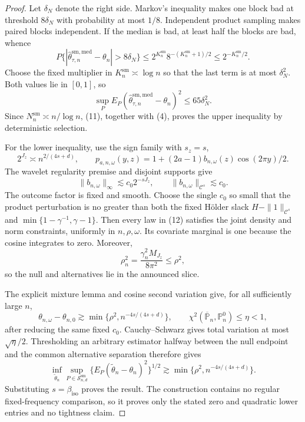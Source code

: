 \documentclass{article}
\begin{document}
\begin{proof}
Let \(\delta_N\) denote the right side.  Markov's inequality makes one block bad at threshold \(8\delta_N\) with probability at most \(1/8\).  Independent product sampling makes paired blocks independent.  If the median is bad, at least half the blocks are bad, whence
\[
P\{|\widehat\theta^{\mathrm{sm,med}}_{\tau,n}-\theta_n|>8\delta_N\}
\le2^{K_n^{\mathrm{sm}}}8^{-(K_n^{\mathrm{sm}}+1)/2}
\le2^{-K_n^{\mathrm{sm}}/2}. \tag{10}
\]
Choose the fixed multiplier in \(K_n^{\mathrm{sm}}\asymp\log n\) so that the last term is at most \(\delta_N^2\).  Both values lie in \([0,1]\), so
\[
\sup_PE_P(\widehat\theta^{\mathrm{sm,med}}_{\tau,n}-\theta_n)^2
\le65\delta_N^2. \tag{11}
\]
Since \(N_n^{\mathrm{sm}}\asymp n/\log n\), (11), together with (4), proves the upper inequality by deterministic selection.

For the lower inequality, use the sign family with \(s_z=s\),
\[
2^{J_z}\asymp n^{2/(4s+d)},
\qquad
p_{a,n,\omega}(y,z)=1+(2a-1)b_{n,\omega}(z)\cos(2\pi y)/2. \tag{12}
\]
The wavelet regularity premise and disjoint supports give
\[
\|b_{n,\omega}\|_\infty\lesssim c_0 2^{-sJ_z},
\qquad
\|b_{n,\omega}\|_{\mathcal C^s}\lesssim c_0. \tag{13}
\]
The outcome factor is fixed and smooth.  Choose the single \(c_0\) so small that the product perturbation is no greater than both the fixed H\"older slack \(H-\|1\|_{\mathcal C^s}\) and \(\min\{1-\gamma^{-1},\gamma-1\}\).  Then every law in (12) satisfies the joint density and norm constraints, uniformly in \(n,\rho,\omega\).  Its covariate marginal is one because the cosine integrates to zero.  Moreover,
\[
\rho_n^2=\frac{\gamma_n^2M_{J_z}}{8\pi^2}\le\rho^2, \tag{14}
\]
so the null and alternatives lie in the announced slice.

The explicit mixture lemma and cosine second variation give, for all sufficiently large \(n\),
\[
\theta_{n,\omega}-\theta_{n,0}
\gtrsim\min\{\rho^2,n^{-4s/(4s+d)}\},
\qquad
\chi^2(\overline{\mathbb P}_n,\mathbb P_n^0)\le\eta<1, \tag{15}
\]
after reducing the same fixed \(c_0\).  Cauchy--Schwarz gives total variation at most \(\sqrt\eta/2\).  Thresholding an arbitrary estimator halfway between the null endpoint and the common alternative separation therefore gives
\[
\inf_{\widetilde\theta_n}\sup_{P\in\mathcal S^{\mathrm{sm}}_{n,d}}
\{E_P(\widetilde\theta_n-\theta_n)^2\}^{1/2}
\gtrsim\min\{\rho^2,n^{-4s/(4s+d)}\}. \tag{16}
\]
Substituting \(s=\beta_{\mathrm{iso}}\) proves the result.  The construction contains no regular fixed-frequency comparison, so it proves only the stated zero and quadratic lower entries and no tightness claim.
\end{proof}
\end{document}
